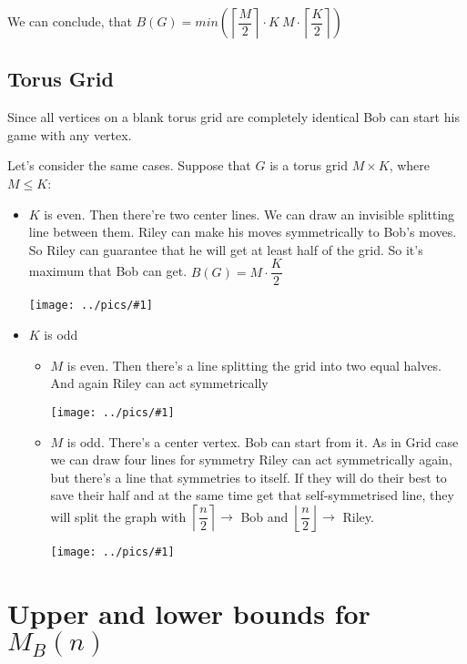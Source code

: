 \documentclass[12pt,a4paper, flushleft]{article}
\newcommand{\gr}[1]{\texttt{[image: ../pics/\#1]}}
\newcommand{\ceil}[1]{\left\lceil #1 \right\rceil}
\newcommand{\floor}[1]{\left\lfloor #1 \right\rfloor}
\begin{document}
	We can conclude, that $B(G) = min\left( \ceil{\dfrac{M}{2}}\cdot K~M\cdot \ceil{\dfrac{K}{2}}\right)$
	
\subsection{Torus Grid}

Since all vertices on a blank torus grid are completely identical Bob can start his game with any vertex.

Let's consider the same cases. Suppose that $G$ is a torus grid $M\times K$, where $M\leqslant K$:
\begin{itemize}
	\item $K$ is even. Then there're two center lines. We can draw an invisible splitting line between them. Riley can make his moves symmetrically to Bob's moves. So Riley can guarantee that he will get at least half of the grid. So it's maximum that Bob can get. $B(G) = M\cdot \dfrac{K}{2}$
	
	\gr{1_3}
	\item $K$ is odd
	\begin{itemize}
		\item $M$ is even. Then there's a line splitting the grid into two equal halves. And again Riley can act symmetrically
		
		\gr{1_31}
		\item $M$ is odd. There's a center vertex. Bob can start from it. As in Grid case we can draw four lines for symmetry
		Riley can act symmetrically again, but there's a line that symmetries to itself. If they will do their best to save their half and at the same time get that self-symmetrised line, they will split the graph with $\ceil{\dfrac{n}{2}}\to$ Bob and $\floor{\dfrac{n}{2}}\to$ Riley.
		
		\gr{b} 
	\end{itemize}
\end{itemize}  

\section{Upper and lower bounds for $M	_B(n)$}
\end{document}
